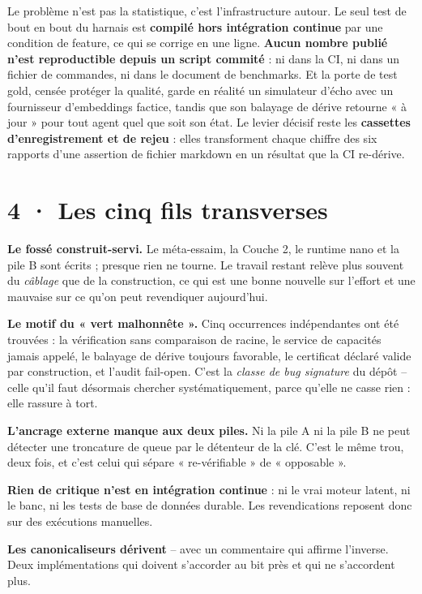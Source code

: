 \documentclass[10pt]{article}
\begin{document}
Le problème n'est pas la statistique, c'est l'infrastructure autour. Le seul test de bout en bout du
harnais est \textbf{compilé hors intégration continue} par une condition de feature, ce qui se corrige
en une ligne. \textbf{Aucun nombre publié n'est reproductible depuis un script commité} : ni dans la
CI, ni dans un fichier de commandes, ni dans le document de benchmarks. Et la porte de test gold, censée
protéger la qualité, garde en réalité un simulateur d'écho avec un fournisseur d'embeddings factice,
tandis que son balayage de dérive retourne « à jour » pour tout agent quel que soit son état. Le levier
décisif reste les \textbf{cassettes d'enregistrement et de rejeu} : elles transforment chaque chiffre
des six rapports d'une assertion de fichier markdown en un résultat que la CI re-dérive.

\section{4 · Les cinq fils transverses}

\textbf{Le fossé construit-servi.} Le méta-essaim, la Couche 2, le runtime nano et la pile B sont
écrits ; presque rien ne tourne. Le travail restant relève plus souvent du \emph{câblage} que de la
construction, ce qui est une bonne nouvelle sur l'effort et une mauvaise sur ce qu'on peut revendiquer
aujourd'hui.

\textbf{Le motif du « vert malhonnête ».} Cinq occurrences indépendantes ont été trouvées : la
vérification sans comparaison de racine, le service de capacités jamais appelé, le balayage de dérive
toujours favorable, le certificat déclaré valide par construction, et l'audit fail-open. C'est la
\emph{classe de bug signature} du dépôt -- celle qu'il faut désormais chercher systématiquement, parce
qu'elle ne casse rien : elle rassure à tort.

\textbf{L'ancrage externe manque aux deux piles.} Ni la pile A ni la pile B ne peut détecter une
troncature de queue par le détenteur de la clé. C'est le même trou, deux fois, et c'est celui qui sépare
« re-vérifiable » de « opposable ».

\textbf{Rien de critique n'est en intégration continue} : ni le vrai moteur latent, ni le banc, ni les
tests de base de données durable. Les revendications reposent donc sur des exécutions manuelles.

\textbf{Les canonicaliseurs dérivent} -- avec un commentaire qui affirme l'inverse. Deux implémentations
qui doivent s'accorder au bit près et qui ne s'accordent plus.
\end{document}
